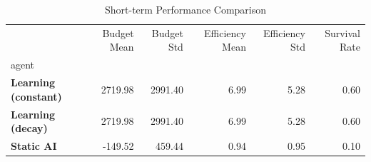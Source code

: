 \begin{table}
\caption{Short-term Performance Comparison}
\label{tab:short_term}
\begin{tabular}{lrrrrr}
\toprule
 & Budget Mean & Budget Std & Efficiency Mean & Efficiency Std & Survival Rate \\
agent &  &  &  &  &  \\
\midrule
\textbf{Learning (constant)} & 2719.98 & 2991.40 & 6.99 & 5.28 & 0.60 \\
\textbf{Learning (decay)} & 2719.98 & 2991.40 & 6.99 & 5.28 & 0.60 \\
\textbf{Static AI} & -149.52 & 459.44 & 0.94 & 0.95 & 0.10 \\
\bottomrule
\end{tabular}
\end{table}
